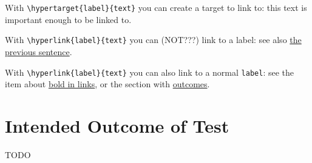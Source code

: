 \documentclass[noauthor]{ximera}
\begin{document}
With \verb|\hypertarget{label}{text}| you can create a target to link to: \hypertarget{ht_bold}{this text is important enough to be linked to}.

With \verb|\hyperlink{label}{text}| you can (NOT???) link to a label: see also \hyperlink{ht_bold}{the previous sentence}.

With \verb|\hyperlink{label}{text}| you can also link to a normal \verb|label|: see the item about \hyperlink{link_bold}{bold in links}, or the section with \hyperref[sec:link:intendedOutcome]{outcomes}.

\section*{Intended Outcome of Test}\label{sec:link:intendedOutcome}

TODO


\end{document}
